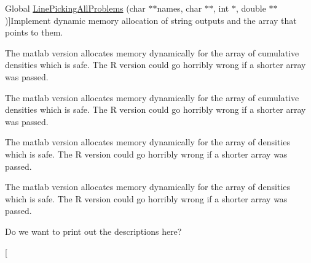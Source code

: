 \begin{DoxyRefList}
\hypertarget{todo__todo000021}{}%
Global \hyperlink{group__api_gadb58de53bac5d2fe684019ce77be9896}{Line\-Picking\-All\-Problems} (char $\ast$$\ast$names, char $\ast$$\ast$, int $\ast$, double $\ast$$\ast$)]Implement dynamic memory allocation of string outputs and the array that points to them.  
\item[\label{todo__todo000024}%
\hypertarget{todo__todo000024}{}%
Global \hyperlink{group__api_ga445ba2c007d60d789747cecbd5f874b9}{Line\-Picking\-C\-D\-F} (double $\ast$, double $\ast$, int $\ast$, int $\ast$, double $\ast$, int $\ast$, int $\ast$, char $\ast$$\ast$)]The matlab version allocates memory dynamically for the array of cumulative densities which is safe. The R version could go horribly wrong if a shorter array was passed.  
\item[\label{todo__todo000025}%
\hypertarget{todo__todo000025}{}%
Global \hyperlink{group__api_ga6e3fe73fe16dd15ec1c503e3623de040}{Line\-Picking\-Inverse\-C\-D\-F} (double $\ast$t, double $\ast$g, int $\ast$\-N, int $\ast$problem, double $\ast$parameters, int $\ast$\-Npar, int $\ast$result, char $\ast$$\ast$error\-\_\-str)]The matlab version allocates memory dynamically for the array of cumulative densities which is safe. The R version could go horribly wrong if a shorter array was passed.  
\item[\label{todo__todo000026}%
\hypertarget{todo__todo000026}{}%
Global \hyperlink{group__api_ga89bd29435ffe1826e97dafb2b0536de1}{Line\-Picking\-Ncoords} (int $\ast$, char $\ast$$\ast$, int $\ast$, double $\ast$, int $\ast$, int $\ast$, char $\ast$$\ast$)]The matlab version allocates memory dynamically for the array of densities which is safe. The R version could go horribly wrong if a shorter array was passed.  
\item[\label{todo__todo000023}%
\hypertarget{todo__todo000023}{}%
Global \hyperlink{group__api_ga8feba9835984bd74f3d919f51389e573}{Line\-Picking\-P\-D\-F} (double $\ast$, double $\ast$, int $\ast$, int $\ast$, double $\ast$, int $\ast$, int $\ast$, char $\ast$$\ast$)]The matlab version allocates memory dynamically for the array of densities which is safe. The R version could go horribly wrong if a shorter array was passed.  
\item[\label{todo__todo000020}%
\hypertarget{todo__todo000020}{}%
Global \hyperlink{group__api_ga1a1c27d3c46da382a0443f810628a8ac}{Line\-Picking\-Print\-All\-Problems} (void)]Do we want to print out the descriptions here?  
\item[\label{todo__todo000019}%
\hypertarget{todo__todo000019}{}%

\end{DoxyRefList}
